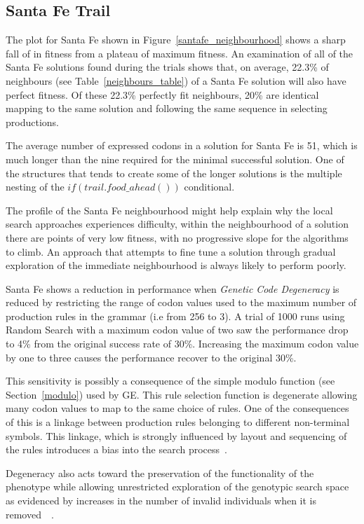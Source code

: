 \subsection{Santa Fe Trail}
The plot for Santa Fe shown in Figure~\ref{santafe_neighbourhood}  shows a sharp fall of in fitness from a plateau of maximum fitness. An examination of all of the Santa Fe solutions found during the trials shows that, on average, 22.3\% of neighbours (see Table~\ref{neighbours_table}) of a Santa Fe solution will also have perfect fitness. Of these 22.3\% perfectly fit neighbours, 20\% are identical mapping to the same solution and following the same sequence in selecting productions. 

The average number of expressed codons in a solution for Santa Fe is 51, which is much longer than the nine required for the minimal successful solution. One of the structures that tends to create some of the longer solutions is the multiple nesting of the \emph{$if(trail.food\_ahead())$} conditional.  

The profile of the Santa Fe neighbourhood might help explain why the local search approaches experiences difficulty, within the neighbourhood of a solution there are points of very low fitness, with no progressive slope for the algorithms to climb. An approach that attempts to fine tune a solution through gradual exploration of the immediate neighbourhood is always likely to perform poorly.

Santa Fe shows a reduction in performance when \emph{Genetic Code Degeneracy} is reduced by restricting  the range of codon values used to the maximum number of production rules in the grammar (i.e from 256 to 3). A trial of 1000 runs using Random Search with a maximum codon value of two saw the performance drop to 4\% from the original success rate of 30\%. Increasing the maximum codon value by one to three causes the performance recover to the original 30\%.

This sensitivity is possibly a consequence of the simple modulo function (see Section~\ref{modulo}) used by GE. This rule selection function is degenerate allowing many codon values to map to the same choice of rules. One of the consequences of this is a linkage between production rules belonging to different non-terminal symbols. This linkage, which is strongly influenced by layout and sequencing of the rules introduces a bias into the search process~\cite{keijzer}.   

Degeneracy also acts toward the preservation of the functionality of the phenotype while allowing unrestricted exploration of the genotypic search space as evidenced by increases in the number of invalid individuals when it is removed~\cite{ge_book}~\cite{mike_thesis}. 

